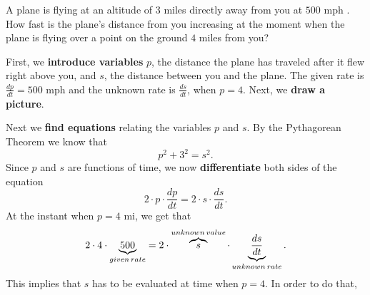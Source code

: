 \documentclass{ximera}
\begin{document}
	
	\begin{example}
		A plane is flying at an altitude of $3$ miles directly away from you at $500$ mph 
		.  How fast is the plane's distance from you increasing at
		the moment when the plane is flying over a point on the ground $4$
		miles from you?
		
		
		\begin{explanation}
			First, we \textbf{introduce variables} $p$, the distance the plane has traveled after  it flew right above you, and $s$, the distance between you and the plane. 
			The given rate is $\frac{dp}{dt}=500$ mph and the unknown rate is $\frac{ds}{dt}$, when $p=4$.
			Next, we \textbf{draw a picture}.
			\begin{image}
			\end{image}
			Next we \textbf{find equations} relating the variables $p$ and $s$. By the Pythagorean Theorem
			we know that
			\[
			p^2+3^2=s^2.
			\] 
			Since  $p$ and $s$ are functions of time, we now
			\textbf{differentiate} both sides of the equation 
			\[
			2\cdot p\cdot \frac{dp}{dt}  = 2\cdot s \cdot \frac{ds}{dt}.
			\] 
			At the instant when  $p=4$ mi, we get that
			\[
			2\cdot4\cdot\underbrace{ 500}_{given\hspace{0.02in}rate}  = 2\cdot \overbrace{s}^{unknown\hspace{0.02in}value} \cdot \underbrace{\frac{ds}{dt}}_{unknown\hspace{0.02in}rate} .
			\] 
			This implies that $s$ has to be evaluated at time when $p=4$. In order to do that,

\end{explanation}
\end{example}
\end{document}
